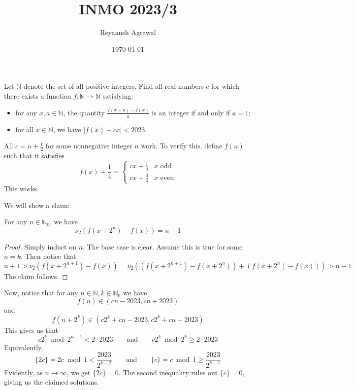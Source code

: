 \documentclass{scrartcl}
\begin{document}
    \title{INMO 2023/3}
    \author{Reyaansh Agrawal}
    \date{\today}

    \maketitle

    \vspace{0.5cm}

    \begin{problem*}
        Let $\mathbb N$ denote the set of all positive integers. Find all real numbers 
        $c$ for which there exists a function $f:\mathbb N\to \mathbb N$ satisfying:
        \begin{itemize}
            \item for any $x,a\in\mathbb N$, the quantity $\frac{f(x+a)-f(x)}{a}$ is an 
            integer if and only if $a=1$;
            \item for all $x\in \mathbb N$, we have $|f(x)-cx|<2023$.
        \end{itemize}
    \end{problem*}


    \begin{answer*} 
        All \(c=n+\frac 12\) for some nonnegative integer \(n\) work. To verify 
        this, define \(f(n)\) such that it satisfies
        \[f(x)+\frac 14=\begin{cases}cx + \frac 14& x \text{ odd}\\cx + \frac 34& x \text{ even}\end{cases}\]
        This works.
    \end{answer*}
    \begin{soln}
        We will show a claim:

        \begin{claim*} 
            For any \(n\in \mathbb N_0\), we have\[\nu_2(f(x+2^{n})-f(x))=n-1\]
        \end{claim*}
        \begin{proof} 
            Simply induct on \(n\). The base case is clear. Assume this is true for some 
            \(n=k\). Then notice that
            \[n+1 > \nu_2(f(x + 2^{n+1})-f(x))=\nu_2((f(x + 2^{n+1})-f(x+2^n))+(f(x+2^n)-f(x)))>n-1\]
            The claim follows.
        \end{proof}
        Now, notice that for any \(n\in\mathbb{N}, k\in\mathbb{N}_0\) we have\[f(n)\in (cn-2023, cn + 2023)\]and\[f(n + 2^k)\in (c2^k + cn-2023, c2^k + cn + 2023)\]This gives us that\[c2^k\bmod{2^{n-1}}<2\cdot 2023\qquad \text{and}\qquad c2^k\bmod 2^k \ge 2\cdot 2023\]Equivalently,\[\{2c\}=2c\bmod 1<\frac{2023}{2^{k-2}}\qquad\text{and}\qquad \{c\}=c\bmod 1 \ge \frac{2023}{2^{k-1}}\]Evidently, as \(n\rightarrow \infty\), we get \(\{2c\}=0\). The second inequality rules out \(\{c\}=0\), giving us the claimed solutions.
    \end{soln}
\end{document}
